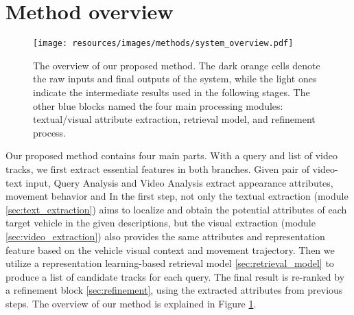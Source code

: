 \section{Method overview}
\label{sec:method_overview}
\begin{figure}[!htb]
    \centering
    \texttt{[image: resources/images/methods/system\_overview.pdf]}
    \caption{The overview of our proposed method. The dark orange cells denote the raw inputs and final outputs of the system, while the light ones indicate the intermediate results used in the following stages. The other blue blocks named the four main processing modules: textual/visual attribute extraction, retrieval model, and refinement process.}
    \label{fig:method_overview}
\end{figure}
Our proposed method contains four main parts. With a query and list of video tracks, we first extract essential features in both branches. 
Given pair of video-text input, Query Analysis and Video Analysis extract appearance attributes, movement behavior and 
In the first step, not only the textual extraction (module \ref{sec:text_extraction}) aims to localize and obtain the potential attributes of each target vehicle in the given descriptions, but the visual extraction (module \ref{sec:video_extraction}) also provides the same attributes and representation feature based on the vehicle visual context and movement trajectory. 
Then we utilize a representation learning-based retrieval model \ref{sec:retrieval_model} to produce a list of candidate tracks for each query. 
The final result is re-ranked by a refinement block \ref{sec:refinement}, using the extracted attributes from previous steps. The overview of our method is explained in Figure \ref{fig:method_overview}.


